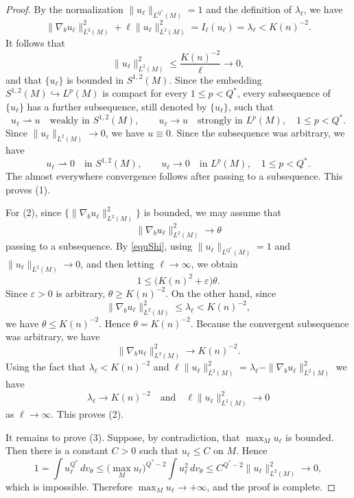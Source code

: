 \documentclass[11pt]{article}
\numberwithin{equation}{section}
\numberwithin{equation}{section}
\begin{document}
	\begin{proof}
		By the normalization \(\|u_\ell\|_{L^{Q^*}(M)}=1\) and the definition of \(\lambda_\ell\), we have
		\[
		\|\nabla_bu_\ell\|_{L^2(M)}^2 + \ell\|u_\ell\|_{L^2(M)}^2 = I_\ell(u_\ell) = \lambda_\ell < K(n)^{-2}.
		\]
		It follows that
		\[
		\|u_\ell\|_{L^2(M)}^2 \leq \frac{K(n)^{-2}}{\ell} \to 0,
		\]
		and that \(\{u_\ell\}\) is bounded in \(S^{1,2}(M)\). Since the embedding \(S^{1,2}(M)\hookrightarrow L^p(M)\) is compact for every \(1\leq p<Q^*\), every subsequence of \(\{u_\ell\}\) has a further subsequence, still denoted by \(\{u_\ell\}\), such that
		\[
		u_\ell\rightharpoonup u \quad\text{weakly in }S^{1,2}(M), \qquad u_\ell\to u \quad\text{strongly in }L^p(M),\quad 1\leq p<Q^*.
		\]
		Since \(\|u_\ell\|_{L^2(M)}\to0\), we have \(u\equiv0\). Since the subsequence was arbitrary, we have
		\[
		u_\ell\rightharpoonup0 \quad\text{in }S^{1,2}(M), \qquad u_\ell\to0 \quad\text{in }L^p(M),\quad 1\leq p<Q^*.
		\]
		The almost everywhere convergence follows after passing to a subsequence. This proves \textup{(1)}.
		
		For \textup{(2)},  since \(\{\|\nabla_bu_\ell\|_{L^2(M)}^2\}\) is bounded, we may assume that
		\[
		\|\nabla_bu_\ell\|_{L^2(M)}^2\to\theta
		\]
		passing to a subsequence. By \eqref{equShi}, using \(\|u_\ell\|_{L^{Q^*}(M)}=1\) and \(\|u_\ell\|_{L^2(M)}\to 0\), and then letting \(\ell \to \infty\), we obtain
		\[
		1 \leq \bigl(K(n)^2+\varepsilon\bigr)\theta .
		\]
		Since \(\varepsilon>0\) is arbitrary, \(\theta\geq K(n)^{-2}\). On the other hand, since
		\[
		\|\nabla_bu_\ell\|_{L^2(M)}^2 \leq \lambda_\ell < K(n)^{-2},
		\]
		we have \(\theta \leq K(n)^{-2}\). Hence \(\theta=K(n)^{-2}\). Because the convergent subsequence was arbitrary, we have
		\[
		\|\nabla_bu_\ell\|_{L^2(M)}^2\to K(n)^{-2}.
		\]
		Using the fact that \(\lambda_\ell< K(n)^{-2}\) and \(\ell\|u_\ell\|_{L^2(M)}^2=\lambda_\ell-\|\nabla_bu_\ell\|_{L^2(M)}^2\) we have
		\[
		\lambda_\ell\to K(n)^{-2} \quad\text{and}\quad \ell\|u_\ell\|_{L^2(M)}^2\to0
		\]
		as \(\ell \to \infty\). This proves \textup{(2)}.
		
		It remains to prove \textup{(3)}. Suppose, by contradiction, that \(\max_Mu_\ell\) is bounded. Then there is a constant \(C>0\) such that \(u_\ell\leq C\) on \(M\). Hence
		\[
		1 = \int u_\ell^{Q^*}\,dv_\theta \leq \bigl(\max_Mu_\ell\bigr)^{Q^*-2} \int u_\ell^2\,dv_\theta \leq C^{Q^*-2}\|u_\ell\|_{L^2(M)}^2 \to0,
		\]
		which is impossible. Therefore \(\max_Mu_\ell\to+\infty\), and the proof is complete.
	\end{proof}
	
\end{document}
